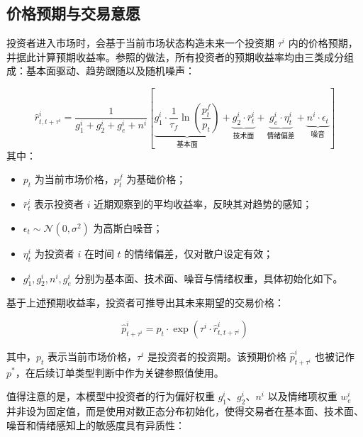 \subsection{价格预期与交易意愿}
\label{subsec:price expectation}

投资者进入市场时，会基于当前市场状态构造未来一个投资期 \(\tau^i\) 内的价格预期，并据此计算预期收益率。参照\textcite{chiarella2009}的做法，所有投资者的预期收益率均由三类成分组成：基本面驱动、趋势跟随以及随机噪声：

\begin{equation}
    \hat{r}_{t,t+\tau^i}^i = 
    \frac{1}{g_1^i + g_2^i + g_e^i + n^i } 
    \left[
    \underbrace{g_1^i \cdot \frac{1}{\tau_f} \ln\left(\frac{p_t^f}{p_t}\right)}_{\text{基本面}} 
    + \underbrace{g_2^i \cdot \bar{r}_t^i}_{\text{技术面}} 
    + \underbrace{g_e^i \cdot \eta_t^i}_{\text{情绪偏差}}
    + \underbrace{n^i \cdot \epsilon_t}_{\text{噪音}} 
    \right]
    \end{equation}
    其中：
    \begin{itemize}
      \item \( p_t \) 为当前市场价格，\( p_t^f \) 为基础价格；
      \item \( \bar{r}_t^i \) 表示投资者 \(i\) 近期观察到的平均收益率，反映其对趋势的感知；
      \item \( \epsilon_t \sim \mathcal{N}(0, \sigma^2) \) 为高斯白噪音；
      \item \( \eta_t^i \) 为投资者 \(i\) 在时间 \(t\) 的情绪偏差，仅对散户设定有效；
      \item \( g_1^i, g_2^i, n^i, g_e^i \) 分别为基本面、技术面、噪音与情绪权重，具体初始化如下。
    \end{itemize}

    基于上述预期收益率，投资者可推导出其未来期望的交易价格：

\begin{equation}
\widehat{p}_{t+\tau^i}^i = p_t \cdot \exp\left( \tau^i \cdot \widehat{r}_{t,t+\tau^i}^i \right)
\label{eq:expected_price}
\end{equation}

其中，\( p_t \) 表示当前市场价格，\( \tau^i \) 是投资者的投资期。该预期价格 \( \widehat{p}_{t+\tau^i}^i \) 也被记作 \( p^* \)，在后续订单类型判断中作为关键参照值使用。

值得注意的是，本模型中投资者的行为偏好权重 \(g_1^i\)、\(g_2^i\)、\(n^i\) 以及情绪项权重 \(w_e^i\) 并非设为固定值，而是使用对数正态分布初始化，使得交易者在基本面、技术面、噪音和情绪感知上的敏感度具有异质性：


